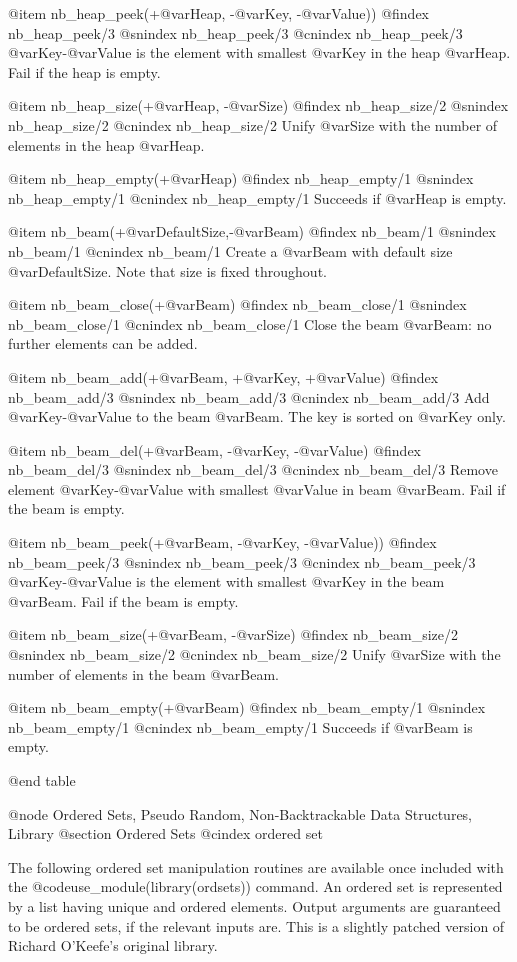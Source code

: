 @item nb_heap_peek(+@var{Heap}, -@var{Key}, -@var{Value}))
@findex nb_heap_peek/3
@snindex nb_heap_peek/3
@cnindex nb_heap_peek/3
@var{Key}-@var{Value} is the element with smallest @var{Key} in the heap
@var{Heap}. Fail if the heap is empty.

@item nb_heap_size(+@var{Heap}, -@var{Size})
@findex nb_heap_size/2
@snindex nb_heap_size/2
@cnindex nb_heap_size/2
Unify @var{Size} with the number of elements in the heap  @var{Heap}.

@item nb_heap_empty(+@var{Heap})
@findex nb_heap_empty/1
@snindex nb_heap_empty/1
@cnindex nb_heap_empty/1
Succeeds if  @var{Heap} is empty.

@item nb_beam(+@var{DefaultSize},-@var{Beam})
@findex nb_beam/1
@snindex nb_beam/1
@cnindex nb_beam/1
Create a @var{Beam} with default size @var{DefaultSize}. Note that size
is fixed throughout.

@item nb_beam_close(+@var{Beam})
@findex nb_beam_close/1
@snindex nb_beam_close/1
@cnindex nb_beam_close/1
Close the beam @var{Beam}: no further elements can be added.

@item nb_beam_add(+@var{Beam}, +@var{Key}, +@var{Value})
@findex nb_beam_add/3
@snindex nb_beam_add/3
@cnindex nb_beam_add/3
Add @var{Key}-@var{Value} to the beam @var{Beam}. The key is sorted on
@var{Key} only.

@item nb_beam_del(+@var{Beam}, -@var{Key}, -@var{Value})
@findex nb_beam_del/3
@snindex nb_beam_del/3
@cnindex nb_beam_del/3
Remove element @var{Key}-@var{Value} with smallest @var{Value} in beam
@var{Beam}. Fail if the beam is empty.

@item nb_beam_peek(+@var{Beam}, -@var{Key}, -@var{Value}))
@findex nb_beam_peek/3
@snindex nb_beam_peek/3
@cnindex nb_beam_peek/3
@var{Key}-@var{Value} is the element with smallest @var{Key} in the beam
@var{Beam}. Fail if the beam is empty.

@item nb_beam_size(+@var{Beam}, -@var{Size})
@findex nb_beam_size/2
@snindex nb_beam_size/2
@cnindex nb_beam_size/2
Unify @var{Size} with the number of elements in the beam  @var{Beam}.

@item nb_beam_empty(+@var{Beam})
@findex nb_beam_empty/1
@snindex nb_beam_empty/1
@cnindex nb_beam_empty/1
Succeeds if  @var{Beam} is empty.

@end table


@node Ordered Sets, Pseudo Random, Non-Backtrackable Data Structures, Library
@section Ordered Sets
@cindex ordered set

The following ordered set manipulation routines are available once
included with the @code{use_module(library(ordsets))} command.  An
ordered set is represented by a list having unique and ordered
elements. Output arguments are guaranteed to be ordered sets, if the
relevant inputs are. This is a slightly patched version of Richard
O'Keefe's original library.

